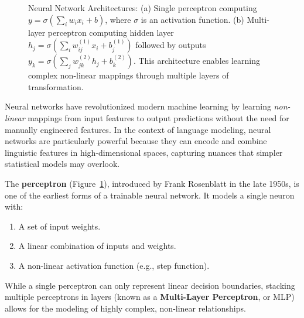 \begin{figure}[htbp]
\caption{Neural Network Architectures: (a) Single perceptron computing $y = \sigma(\sum_{i} w_i x_i + b)$, where $\sigma$ is an activation function. 
(b) Multi-layer perceptron computing hidden layer $h_j = \sigma(\sum_{i} w^{(1)}_{ij} x_i + b^{(1)}_j)$ followed by outputs 
$y_k = \sigma(\sum_{j} w^{(2)}_{jk} h_j + b^{(2)}_k)$. This architecture enables learning complex non-linear mappings through multiple layers of transformation.}
\label{fig:neural_architectures}
\end{figure}

\noindent
Neural networks have revolutionized modern machine learning by learning \emph{non-linear} mappings from input features to output predictions without the need for manually engineered features. In the context of language modeling, neural networks are particularly powerful because they can encode and combine linguistic features in high-dimensional spaces, capturing nuances that simpler statistical models may overlook.

\noindent
The \textbf{perceptron} (Figure~\ref{fig:neural_architectures}), introduced by Frank Rosenblatt in the late 1950s, is one of the earliest forms of a trainable neural network. It models a single neuron with:
\begin{enumerate}
    \item A set of input weights.
    \item A linear combination of inputs and weights.
    \item A non-linear activation function (e.g., step function).
\end{enumerate}
While a single perceptron can only represent linear decision boundaries, stacking multiple perceptrons in layers (known as a \textbf{Multi-Layer Perceptron}, or MLP) allows for the modeling of highly complex, non-linear relationships.


